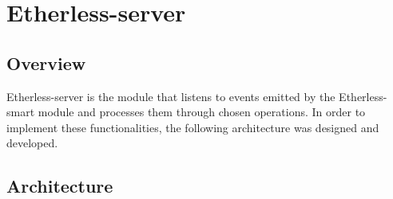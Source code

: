 \section{Etherless-server}
	\subsection{Overview} %
	Etherless-server is the module that listens to events emitted by the Etherless-smart module and processes them through chosen operations. In order to implement these functionalities, the following architecture was designed and developed.
	\subsection{Architecture}

